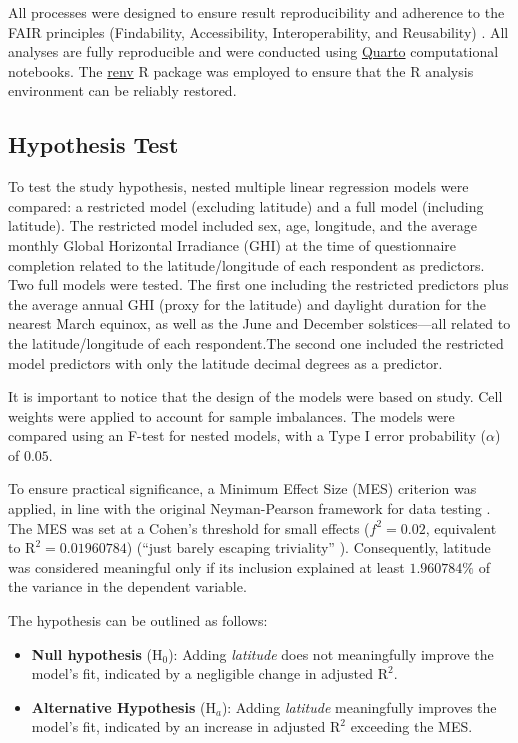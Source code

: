 \documentclass[
12pt,
openright,
oneside,
a4paper,
chapter=TITLE,
section=TITLE,
french,
spanish,
brazil,
english
]{abntex2}
\begin{document}
All processes were designed to ensure result reproducibility and
adherence to the FAIR principles (Findability, Accessibility,
Interoperability, and Reusability) \autocite{wilkinson2016}. All
analyses are fully reproducible and were conducted using
\href{https://quarto.org/}{Quarto} computational notebooks. The
\href{https://rstudio.github.io/renv/}{renv} R package \autocite{usheya}
was employed to ensure that the R analysis environment can be reliably
restored.

\subsection{Hypothesis Test}\label{hypothesis-test}

To test the study hypothesis, nested multiple linear regression models
were compared: a restricted model (excluding latitude) and a full model
(including latitude). The restricted model included sex, age, longitude,
and the average monthly Global Horizontal Irradiance (GHI) at the time
of questionnaire completion related to the latitude/longitude of each
respondent as predictors. Two full models were tested. The first one
including the restricted predictors plus the average annual GHI (proxy
for the latitude) and daylight duration for the nearest March equinox,
as well as the June and December solstices---all related to the
latitude/longitude of each respondent.The second one included the
restricted model predictors with only the latitude decimal degrees as a
predictor.

It is important to notice that the design of the models were based on
\textcite{leocadio-miguel2017} study. Cell weights were applied to
account for sample imbalances. The models were compared using an F-test
for nested models, with a Type I error probability (\(\alpha\)) of
\(0.05\).

To ensure practical significance, a Minimum Effect Size (MES) criterion
was applied, in line with the original Neyman-Pearson framework for data
testing \autocite{neyman1928,neyman1928a,perezgonzalez2015}. The MES was
set at a Cohen's threshold for small effects (\(f^2 = 0.02\), equivalent
to \(\text{R}^2 = 0.01960784\)) (``just barely escaping triviality''
\autocite[413]{cohen1988a}). Consequently, latitude was considered
meaningful only if its inclusion explained at least \(1.960784\%\) of
the variance in the dependent variable.

The hypothesis can be outlined as follows:

\begin{itemize}
\item
  \textbf{Null hypothesis} (\(\text{H}_{0}\)): Adding \emph{latitude}
  does not meaningfully improve the model's fit, indicated by a
  negligible change in adjusted \(\text{R}^{2}\).
\item
  \textbf{Alternative Hypothesis} (\(\text{H}_{a}\)): Adding
  \emph{latitude} meaningfully improves the model's fit, indicated by an
  increase in adjusted \(\text{R}^{2}\) exceeding the MES.
\end{itemize}
\end{document}
